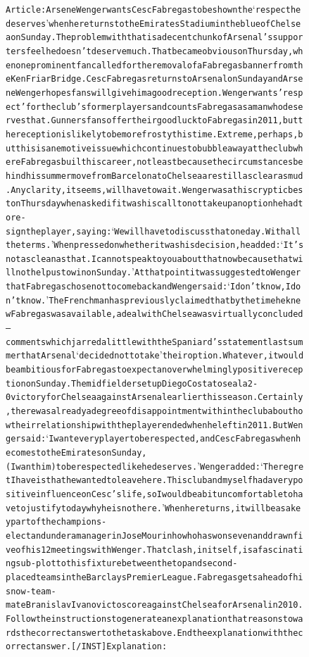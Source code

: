 \begin{figure}[t]
{{\begin{alltt}
Article: Arsene Wenger wants Cesc Fabregas to be shown the ‘respect he deserves’ when he returns to the Emirates Stadium in the blue of Chelsea on Sunday. The problem with that is a decent chunk of Arsenal’s supporters feel he doesn’t deserve much. That became obvious on Thursday, when one prominent fan called for the removal of a Fabregas banner from the Ken Friar Bridge. Cesc Fabregas returns to Arsenal on Sunday and Arsene Wenger hopes fans will give him a good reception . Wenger wants 'respect' for the club's former players and counts Fabregas as a man who deserves that . Gunners fans offer their good luck to Fabregas in 2011, but the reception is likely to be more frosty this time . Extreme, perhaps, but this is an emotive issue which continues to bubble away at the club where Fabregas built his career, not least because the circumstances behind his summer move from Barcelona to Chelsea are still as clear as mud. Any clarity, it seems, will have to wait. Wenger was at his cryptic best on Thursday when asked if it was his call to not take up an option he had to re-sign the player, saying: ‘We will have to discuss that one day. With all the terms.’ When pressed on whether it was his decision, he added: ‘It’s not as clean as that. I cannot speak to you about that now because that will not help us to win on Sunday.’ At that point it was suggested to Wenger that Fabregas chose not to come back and Wenger said: ‘I don’t know, I don’t know.’ The Frenchman has previously claimed that by the time he knew Fabregas was available, a deal with Chelsea was virtually concluded — comments which jarred a little with the Spaniard’s statement last summer that Arsenal ‘decided not to take’ their option. Whatever, it would be ambitious for Fabregas to expect an overwhelmingly positive reception on Sunday. The midfielder set up Diego Costa to seal a 2-0 victory for Chelsea against Arsenal earlier this season . Certainly, there was already a degree of disappointment within the club about how their relationship with the player ended when he left in 2011. But Wenger said: ‘I want every player to be respected, and Cesc Fabregas when he comes to the Emirates on Sunday, (I want him) to be respected like he deserves.’ Wenger added: ‘The regret I have is that he wanted to leave here. This club and myself had a very positive influence on Cesc’s life, so I would be a bit uncomfortable to have to justify today why he is not here.’ When he returns, it will be as a key part of the champions-elect and under a manager in Jose Mourinho who has won seven and drawn five of his 12 meetings with Wenger. That clash, in itself, is a fascinating sub-plot to this fixture between the top and second-placed teams in the Barclays Premier League. Fabregas gets ahead of his now-team-mate Branislav Ivanovic to score against Chelsea for Arsenal in 2010 .
Follow the instructions to generate an explanation that reasons towards the correct answer to the task above. End the explanation with the correct answer. [/INST] Explanation: 


\end{alltt}}}
\end{figure}
